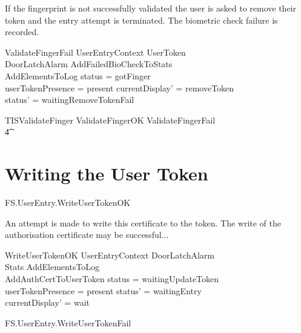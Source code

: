 If the fingerprint is not successfully validated the user is asked to
remove their token and the entry attempt is terminated. 
The biometric check failure is recorded.

\begin{schema}{ValidateFingerFail}
        UserEntryContext
\also
	\Xi UserToken
\\      \Xi DoorLatchAlarm
\also      
        AddFailedBioCheckToStats
\\      AddElementsToLog
\where
        status = gotFinger
\\      userTokenPresence = present
\also
        currentDisplay' = removeToken
\\      status' = waitingRemoveTokenFail
\end{schema}

\begin{zed}
        TISValidateFinger  ValidateFingerOK \lor ValidateFingerFail
\\ \t4  \lor [~ UserTokenTorn | status = gotFinger ~]
\end{zed}

\section{Writing the User Token}


\begin{traceunit}{FS.UserEntry.WriteUserTokenOK}
\end{traceunit}

An attempt is made to write this certificate to the token. The write of
the authorisation certificate may be successful...

\begin{schema}{WriteUserTokenOK}
	UserEntryContext
\also
	\Xi DoorLatchAlarm
\\      \Xi Stats
\also
        AddElementsToLog
\\      AddAuthCertToUserToken
\where
	status = waitingUpdateToken
\\      userTokenPresence = present
\also
        status' = waitingEntry
\\      currentDisplay' = wait
\end{schema}


\begin{traceunit}{FS.UserEntry.WriteUserTokenFail}
\end{traceunit}

